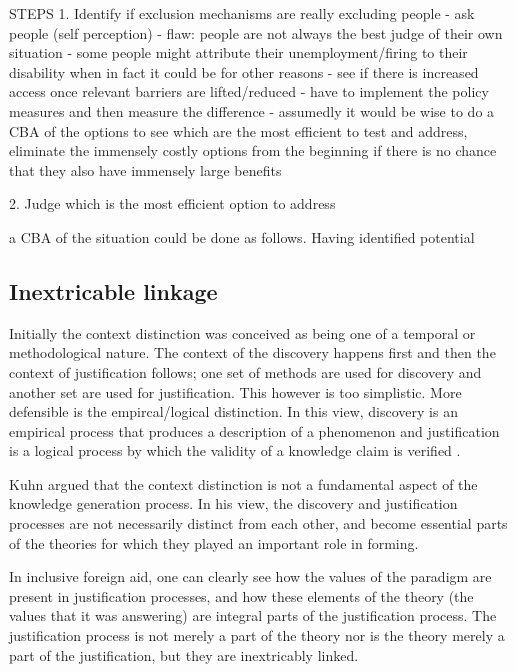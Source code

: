 \documentclass[a4paper]{article}
\begin{document}
STEPS
1. Identify if exclusion mechanisms are really excluding people
    - ask people (self perception)
        - flaw: people are not always the best judge of their own situation
            - some people might attribute their unemployment/firing to their
            disability when in fact it could be for other reasons
    - see if there is increased access once relevant barriers are
      lifted/reduced
        - have to implement the policy measures and then measure the
          difference
        - assumedly it would be wise to do a CBA of the options to see which
        are the most efficient to test and address, eliminate the immensely
        costly options from the beginning if there is no chance that they also
        have immensely large benefits

2. Judge which is the most efficient option to address


a CBA of the situation could be done as follows. Having identified potential 



\subsection{Inextricable linkage}

Initially the context distinction was conceived as being one of a temporal or
methodological nature. The context of the discovery happens first and then the
context of justification follows; one set of methods are used for discovery
and another set are used for justification. This however is too simplistic.
More defensible is the empircal/logical distinction. In this view, discovery
is an empirical process that produces a description of a phenomenon and
justification is a logical process by which the validity of a knowledge claim
is verified \cite{hoyningen2006context}.

Kuhn argued that the context distinction is not a fundamental aspect of the
knowledge generation process. In his view, the discovery and justification
processes are not necessarily distinct from each other, and become essential
parts of the theories for which they played an important role in forming.

In inclusive foreign aid, one can clearly see how the values of the paradigm
are present in justification processes, and how these elements of the theory (the
values that it was answering) are integral parts of the justification process.
The justification process is not merely a part of the theory nor is the theory
merely a part of the justification, but they are inextricably linked.
\end{document}

